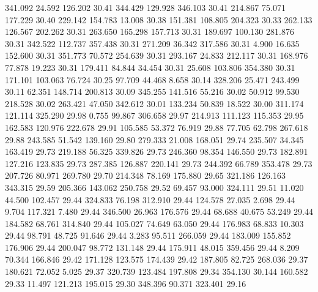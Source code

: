  341.092   24.592  126.202        30.41
 344.429  129.928  346.103        30.41
 214.867   75.071  177.229        30.40
 229.142  154.783   13.008        30.38
 151.381  108.805  204.323        30.33
 262.133  126.567  202.262        30.31
 263.650  165.298  157.713        30.31
 189.697  100.130  281.876        30.31
 342.522  112.737  357.438        30.31
 271.209   36.342  317.586        30.31
   4.900   16.635  152.600        30.31
 351.773   70.572  254.639        30.31
 293.167   24.833  212.117        30.31
 168.976   77.878   19.223        30.31
 179.411   84.844   34.454        30.31
  25.608  103.806  354.380        30.31
 171.101  103.063   76.724        30.25
  97.709   44.468    8.658        30.14
 328.206   25.471  243.499        30.11
  62.351  148.714  200.813        30.09
 345.255  141.516   55.216        30.02
  50.912   99.530  218.528        30.02
 263.421   47.050  342.612        30.01
 133.234   50.839   18.522        30.00
 311.174  121.114  325.290        29.98
   0.755   99.867  306.658        29.97
 214.913  111.123  115.353        29.95
 162.583  120.976  222.678        29.91
 105.585   53.372   76.919        29.88
  77.705   62.798  267.618        29.88
 243.585   51.542  139.160        29.80
 279.333   21.008  168.051        29.74
 235.507   34.345  163.419        29.73
 219.188   56.325  339.826        29.73
 246.360   98.354  146.550        29.73
 182.891  127.216  123.835        29.73
 287.385  126.887  220.141        29.73
 244.392   66.789  353.478        29.73
 207.726   80.971  269.780        29.70
 214.348   78.169  175.880        29.65
 321.186  126.163  343.315        29.59
 205.366  143.062  250.758        29.52
  69.457   93.000  324.111        29.51
  11.020   44.500  102.457        29.44
 324.833   76.198  312.910        29.44
 124.578   27.035    2.698        29.44
   9.704  117.321    7.480        29.44
 346.500   26.963  176.576        29.44
  68.688   40.675   53.249        29.44
 184.582   68.761  314.840        29.44
 105.027   74.649   63.050        29.44
 176.983   68.833   10.303        29.44
  98.791   48.725   91.646        29.44
   3.283   95.511  266.059        29.44
 183.009  155.852  176.906        29.44
 200.047   98.772  131.148        29.44
 175.911   48.015  359.456        29.44
   8.209   70.344  166.846        29.42
 171.128  123.575  174.439        29.42
 187.805   82.725  268.036        29.37
 180.621   72.052    5.025        29.37
 320.739  123.484  197.808        29.34
 354.130   30.144  160.582        29.33
  11.497  121.213  195.015        29.30
 348.396   90.371  323.401        29.16
